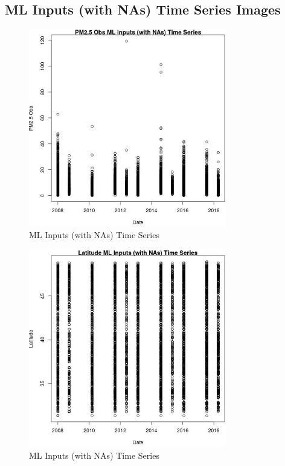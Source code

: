 
\subsection{ML Inputs (with NAs) Time Series Images} 
 

\begin{figure} 
\centering  
\includegraphics[width=0.77\textwidth]{Code_Outputs/Report_ML_input_PM25_Step4_part_e_de_duplicated_aves_compiled_2019-05-18wNAs_PM25_ObsvDate.jpg} 
\caption{\label{fig:Report_ML_input_PM25_Step4_part_e_de_duplicated_aves_compiled_2019-05-18wNAsPM25_ObsvDate}ML Inputs (with NAs) Time Series} 
\end{figure} 
 

\begin{figure} 
\centering  
\includegraphics[width=0.77\textwidth]{Code_Outputs/Report_ML_input_PM25_Step4_part_e_de_duplicated_aves_compiled_2019-05-18wNAs_LatitudevDate.jpg} 
\caption{\label{fig:Report_ML_input_PM25_Step4_part_e_de_duplicated_aves_compiled_2019-05-18wNAsLatitudevDate}ML Inputs (with NAs) Time Series} 
\end{figure} 
 

